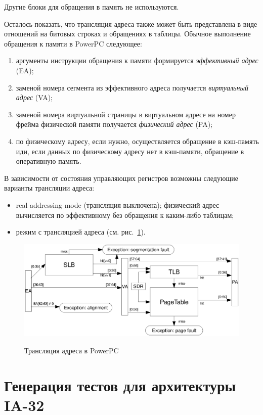 Другие блоки для обращения в память не используются.

Осталось показать, что трансляция адреса также может быть представлена в виде
отношений на битовых строках и обращениях в таблицы. Обычное выполнение
обращения к памяти в PowerPC следующее:
\begin{enumerate}
    \item аргументы инструкции обращения к памяти формируется \emph{эффективный
адрес} (EA);
    \item заменой номера сегмента из эффективного адреса получается
\emph{виртуальный адрес} (VA);
    \item заменой номера виртуальной страницы в виртуальном адресе на номер
фрейма физической памяти получается \emph{физический адрес} (PA);
    \item по физическому адресу, если нужно, осуществляется обращение в
кэш-память иди, если данных по физическому адресу нет в кэш-памяти, обращение в
оперативную память.
\end{enumerate}

В зависимости от состояния управляющих регистров возможны следующие варианты
трансляции адреса:
\begin{itemize}
  \item real addressing mode (трансляция выключена); физический адрес
вычисляется по эффективному без обращения к каким-либо таблицам;
  \item режим с трансляцией адреса (см. рис.~\ref{fig:ppc_address_translation}).
\end{itemize}

\begin{figure}[h] \center
  \includegraphics[width=\textwidth]{4.analysis/ppc_addrtrans}\\
  \caption{Трансляция адреса в PowerPC}\label{fig:ppc_address_translation}
\end{figure}


\section{Генерация тестов для архитектуры IA-32}

